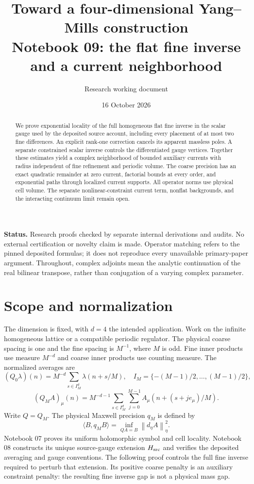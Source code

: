 \documentclass[11pt]{article}
\title{Toward a four-dimensional Yang--Mills construction\\
\large Notebook 09: the flat fine inverse and a current neighborhood}
\author{Research working document}
\date{16 October 2026}
\theoremstyle{remark}
\newcommand{\norm}[1]{\left\|#1\right\|}
\begin{document}
\maketitle

\begin{abstract}
We prove exponential locality of the full homogeneous flat fine
inverse in the scalar gauge used by the deposited source account,
including every placement of at most two fine differences. An explicit
rank-one correction cancels its apparent massless poles. A separate
constrained scalar inverse controls the differentiated gauge vertices.
Together these estimates yield a complex neighborhood of bounded
auxiliary currents with radius independent of fine refinement and
periodic volume. The coarse precision has an exact quadratic remainder
at zero current, factorial bounds at every order, and exponential
paths through localized current supports. All operator norms use
physical cell volume. The separate nonlinear-constraint current term,
nonflat backgrounds, and the interacting continuum limit remain open.
\end{abstract}

\noindent\textbf{Status.}
Research proofs checked by separate internal derivations and audits.
No external certification or novelty claim is made. Operator matching
refers to the pinned deposited formulas; it does not reproduce every
unavailable primary-paper argument. Throughout, complex adjoints mean
the analytic continuation of the real bilinear transpose, rather than
conjugation of a varying complex parameter.

\section{Scope and normalization}

The dimension is fixed, with $d=4$ the intended application. Work on
the infinite homogeneous lattice or a compatible periodic regulator.
The physical coarse spacing is one and the fine spacing is $M^{-1}$,
where $M$ is odd. Fine inner products use measure $M^{-d}$ and coarse
inner products use counting measure. The normalized averages are
\[
 (Q_0\lambda)(n)=M^{-d}\sum_{s\in I_M^d}\lambda(n+s/M),
 \quad I_M=\{-(M-1)/2,\ldots,(M-1)/2\},
\]
\[
 (Q_M A)_\mu(n)=M^{-d-1}\sum_{s\in I_M^d}\sum_{j=0}^{M-1}
 A_\mu(n+(s+je_\mu)/M).
\]
Write $Q=Q_M$. The physical Maxwell precision $q_M$ is defined by
\[
 \langle B,q_MB\rangle=\inf_{QA=B}\norm{d_\eta A}_\eta^2.
\]
Notebook 07 proves its uniform holomorphic symbol and cell locality.
Notebook 08 constructs its unique source-gauge extension $H_{\rm src}$
and verifies the deposited averaging and gauge conventions. The
following proof controls the full fine inverse required to perturb
that extension. Its positive coarse penalty is an auxiliary constraint
penalty: the resulting fine inverse gap is not a physical mass gap.
\end{document}
